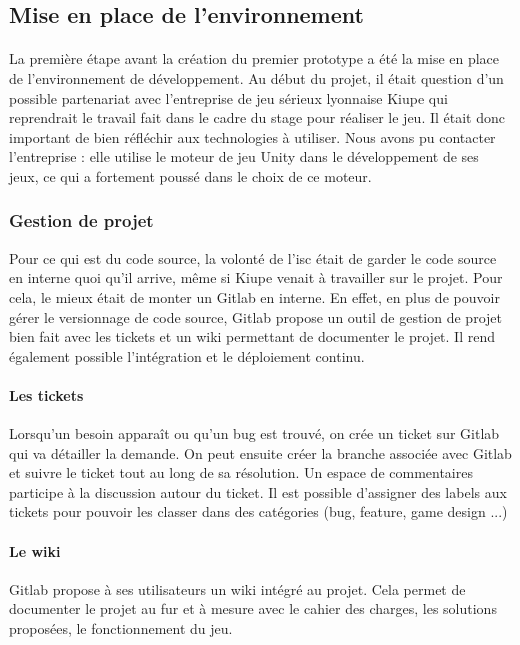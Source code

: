 \subsection{Mise en place de l'environnement}

\paragraph{}La première étape avant la création du premier prototype a été la mise en place de l'environnement de développement. Au début du projet, il était question d'un possible
partenariat avec l'entreprise de jeu sérieux lyonnaise Kiupe qui reprendrait le travail fait dans le cadre du stage pour réaliser le jeu. Il était donc important de bien réfléchir aux
technologies à utiliser. Nous avons pu contacter l'entreprise : elle utilise le moteur de jeu Unity dans le développement de ses jeux, ce qui a fortement poussé dans le choix de ce
moteur.


\subsubsection{Gestion de projet}

Pour ce qui est du code source, la volonté de l'\gls{isc} était de garder le code source en interne quoi qu'il arrive, même si \gls{Kiupe} venait à travailler sur le projet. Pour cela,
le mieux était de monter un Gitlab en interne. En effet, en plus de pouvoir gérer le versionnage de code source, Gitlab propose un outil de gestion de projet bien fait avec les tickets 
et un wiki permettant de documenter le projet. Il rend également possible l'intégration et le déploiement continu.

\paragraph{Les tickets}Lorsqu'un besoin apparaît ou qu'un bug est trouvé, on crée un ticket sur Gitlab qui va détailler la demande. On peut ensuite créer la branche associée avec
Gitlab et suivre le ticket tout au long de sa résolution. Un espace de commentaires participe à la discussion autour du ticket. Il est possible d'assigner des labels aux tickets pour
pouvoir les classer dans des catégories (bug, feature, game design ...)

\paragraph{Le wiki}Gitlab propose à ses utilisateurs un wiki intégré au projet. Cela permet de documenter le projet au fur et à mesure avec le cahier des charges, les solutions
proposées, le fonctionnement du jeu.


